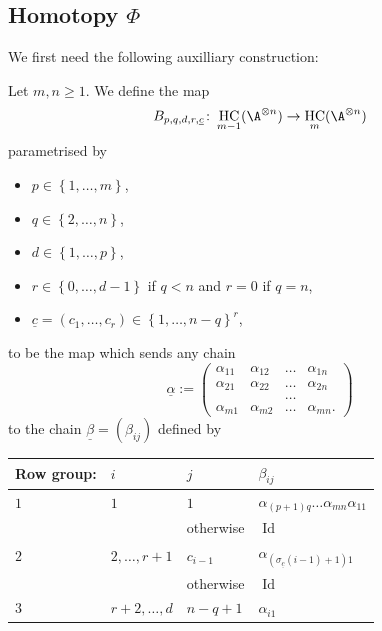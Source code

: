 \documentclass[12pt,a4paper,reqno]{amsart}
\DeclareMathOperator{\id}{Id}
\DeclareMathOperator{\hochcx}{{HC}}
\begin{document}
\subsection{Homotopy $\Phi$}

We first need the following auxilliary construction:

\begin{defn}
\label{defn-cut-and-slice-matrix-operation-bpqdrc}
Let $m,n \geq 1$. We define the map 
\begin{equation}
B_{p,q,d,r,\underline{c}}\colon 
\hochcx_{m-1}(\A^{\otimes n})  \rightarrow 
\hochcx_{m}(\A^{\otimes n})
\end{equation}
parametrised by
\begin{itemize}
\item $p \in \left\{1, \dots, m\right\}$,
\item $q \in \left\{2, \dots, n\right\}$,
\item $d \in \left\{1, \dots, p\right\}$, 
\item $r \in \left\{0, \dots, d-1\right\}$ if $q < n$ and $r = 0$ if $q = n$, 
\item $\underline{c} = (c_1, \dots, c_r) \in \left\{ 1, \dots, n-q \right\}^r$,
\end{itemize}
to be the map 
which sends any chain
\begin{equation*}
\underline{\alpha}
:= 
\begin{pmatrix}
\alpha_{11} & \alpha_{12} & \dots & \alpha_{1n}  
\\
\alpha_{21} & \alpha_{22} & \dots & \alpha_{2n}  
\\
& & \dots & 
\\
\alpha_{m1} & \alpha_{m2} & \dots & \alpha_{mn}. 
\end{pmatrix} 
\end{equation*}
to the chain $\underline{\beta} = (\beta_{ij})$ defined by 
\\
\begin{tabular}{|l|l|l|l|}
\hline
Row group:
&
$i$
&
$j$
&
$\beta_{ij}$
\\
\hline
$1$
&
$1$ 
&
$1$
&
$\alpha_{(p+1)q}\dots\alpha_{mn}\alpha_{11}$
\\
&
&
otherwise
&
$\id$
\\
\hline
$2$
&
$2,\dots,r+1$
&
$c_{i-1}$
&
$\alpha_{\left(\sigma_{\underline{c}}(i-1)+1\right)1}$
\\
&
&
otherwise
&
$\id$
\\
\hline
$3$
&
$r+2, \dots, d$
& 
$n-q+1$
&
$\alpha_{i1}$
\\

\end{tabular}
\end{defn}
\end{document}
